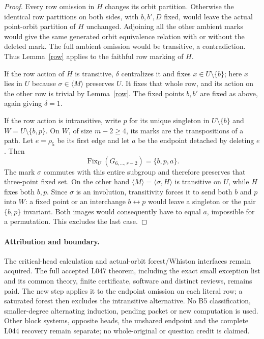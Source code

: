 \documentclass[11pt,a4paper]{article}
\newcommand{\gen}[1]{\langle#1\rangle}
\begin{document}
\begin{proof}
Every row omission in $H$ changes its orbit partition.
Otherwise the identical row partitions on both sides, with
$b,b',D$ fixed, would leave the actual point-orbit partition
of $H$ unchanged. Adjoining all the other ambient marks
would give the same generated orbit equivalence relation
with or without the deleted mark. The full ambient omission
would be transitive, a contradiction. Thus Lemma~\ref{row}
applies to the faithful row marking of $H$.

If the row action of $H$ is transitive, $\delta$ centralizes
it and fixes $x\in U\setminus\{b\}$; here $x$ lies
in $U$ because $\sigma\in\gen M$ preserves $U$.
It fixes that whole row, and its action on the other row
is trivial by Lemma~\ref{row}. The fixed points $b,b'$
are fixed as above, again giving $\delta=1$.

If the row action is intransitive, write $p$ for its unique
singleton in $U\setminus\{b\}$ and $W=U\setminus\{b,p\}$.
On $W$, of size $m-2\ge4$, its marks are the transpositions
of a path. Let $e=\rho_5$ be its first edge and let $a$
be the endpoint detached by deleting $e$. Then
\[
        \operatorname{Fix}_U(G_{6,\ldots,r-2})=\{b,p,a\}.
\]
The mark $\sigma$ commutes with this entire subgroup and
therefore preserves that three-point fixed set. On the other
hand $\gen M=\gen{\sigma,H}$ is transitive on $U$,
while $H$ fixes both $b,p$. Since $\sigma$ is an involution,
transitivity forces it to send both $b$ and $p$ into $W$:
a fixed point or an interchange $b\leftrightarrow p$ would
leave a singleton or the pair $\{b,p\}$ invariant.
Both images would consequently have to equal $a$, impossible
for a permutation. This excludes the last case.
\end{proof}

\paragraph{Attribution and boundary.}
The critical-head calculation and actual-orbit forest/Whiston
interfaces remain acquired. The full accepted L047 theorem,
including the exact small exception list and its common theory,
finite certificate, software and distinct reviews, remains paid.
The new step applies it to the endpoint omission on each literal
row; a saturated forest then excludes the intransitive alternative.
No B5 classification, smaller-degree alternating induction,
pending packet or new computation is used. Other block systems,
opposite heads, the unshared endpoint and the complete L044
recovery remain separate; no whole-original or question credit
is claimed.
\end{document}
